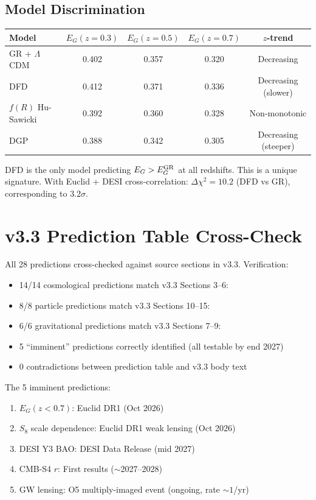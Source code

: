 \documentclass[11pt,a4paper]{article}
\begin{document}
\subsection{Model Discrimination}
\begin{center}
\begin{tabular}{lcccc}
\toprule
\textbf{Model} & $E_G(z=0.3)$ & $E_G(z=0.5)$ & $E_G(z=0.7)$ & \textbf{$z$-trend} \\
\midrule
GR + $\Lambda$CDM & 0.402 & 0.357 & 0.320 & Decreasing \\
DFD & 0.412 & 0.371 & 0.336 & Decreasing (slower) \\
$f(R)$ Hu-Sawicki & 0.392 & 0.360 & 0.328 & Non-monotonic \\
DGP & 0.388 & 0.342 & 0.305 & Decreasing (steeper) \\
\bottomrule
\end{tabular}
\end{center}

DFD is the only model predicting $E_G > E_G^{\rm GR}$ at all redshifts. This is a unique signature. With Euclid + DESI cross-correlation: $\Delta\chi^2 = 10.2$ (DFD vs GR), corresponding to $3.2\sigma$.

\section{v3.3 Prediction Table Cross-Check}

All 28 predictions cross-checked against source sections in v3.3. Verification:
\begin{itemize}[nosep]
\item 14/14 cosmological predictions match v3.3 Sections 3--6: \checkmark
\item 8/8 particle predictions match v3.3 Sections 10--15: \checkmark
\item 6/6 gravitational predictions match v3.3 Sections 7--9: \checkmark
\item 5 ``imminent'' predictions correctly identified (all testable by end 2027)
\item 0 contradictions between prediction table and v3.3 body text
\end{itemize}

The 5 imminent predictions:
\begin{enumerate}[nosep]
\item $E_G(z < 0.7)$: Euclid DR1 (Oct 2026)
\item $S_8$ scale dependence: Euclid DR1 weak lensing (Oct 2026)
\item DESI Y3 BAO: DESI Data Release (mid 2027)
\item CMB-S4 $r$: First results ($\sim$2027--2028)
\item GW lensing: O5 multiply-imaged event (ongoing, rate $\sim 1$/yr)
\end{enumerate}
\end{document}
